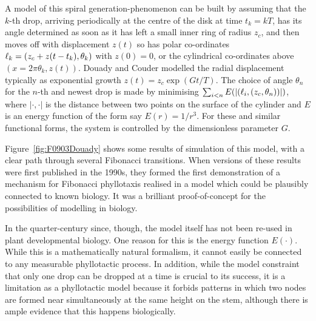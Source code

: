 A model of this spiral generation-phenomenon  can be built by assuming that the $k$\nobreakdash-th drop, arriving periodically at the centre of the disk at time $t_k= k T$, has its angle determined as soon as it has left a small inner ring of radius $z_c$, and then moves off with displacement $z(t)$ so has polar co-ordinates $\ell_{{k}}=(z_c+z(t-t_k), \theta_k)$ with  $z(0)=0$, or the cylindrical co-ordinates above $(x=2\pi \theta_k,z(t))$. Douady and Couder modelled the radial displacement typically as exponential growth $z(t)=z_c\exp (Gt/T)$. 
 The choice of angle $\theta_n$ for the $n$-th and newest drop is made by minimising $\sum_{i<n} E(|(\ell_{{i}}, (z_c,\theta_n) )|)$, where $|\cdot,\cdot|$ is the distance  between two points on the surface of the cylinder and $E$ is an energy function of the form say $E(r)=1/r^3$.  For these and similar functional forms, the system is controlled by the dimensionless parameter $G$. 
  
  Figure~\ref{fig:F0903Douady} shows some results of simulation of this model, with a clear path through several Fibonacci transitions.  When versions of these  results were first published in the 1990s, they formed the first demonstration of a mechanism for Fibonacci phyllotaxis realised in a model which could be plausibly connected to known biology. It was a brilliant proof-of-concept for the possibilities of modelling in biology. 
  
  In the quarter-century since, though, the model itself has not been  re-used in plant developmental biology. One reason for this is the 
  energy function $E(\cdot)$. While this is a mathematically natural formalism, it cannot easily be connected to any measurable phyllotactic process. In addition, while the model constraint that only one drop can be dropped at a time is crucial to its success, it is a limitation as a phyllotactic model because it forbids patterns in which two nodes are formed near simultaneously at the same height on the stem, although there is ample evidence that this happens biologically. 
  
 




\clearpage

